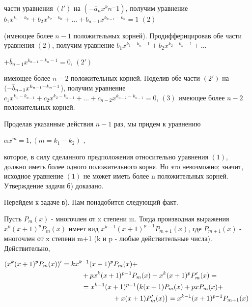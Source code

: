 \begin{minipage}[t]{0.71\textwidth}
части уравнения $(l')$ на $(-\overline{a}_nx^kn^-1)$, получим уравнение $b_1x^{k_1-k_n} + b_2x^{k_2-k_n} + \dots + b_{n-1}x^{k_{n-1}-k_n} = 1$\hspace{10.63cm} $(2)$

\vspace{0.2cm}
(имеющее более $n-1$ положительных корней). Продиффернцировав обе части уравнения $(2)$, получим уравнение $\overline{b}_1x^{k_1-k_n-1} + {\overline{b}_2x^{k_2-k_n-1} + \dots}$ 

\hspace{8.45cm}
$+\overline{b}_{n-1}x^{k_{n-1}-k_n-1} = 0$,
\hspace{1.2cm} $(2')$

\vspace{0.2cm}
имеющее более $n-2$ положительных корней. Поделив обе части $(2')$ на $(-\overline{b}_{n-1} \\ x^{k_{n-1}-k_n-1}$), получим уравнение $c_1x^{k_1-k_{n-1}} + c_2x^{k_2-k_{n-1}} + \dots + c_{n-2}x^{k_{n-2}-k_{n-1}} = 0$, $(3)$ имеющее более $n-2$ положительных корней.

\hspace{1cm}
Проделав указанные действия $n-1$ раз, мы придем к уравнению

\begin{center}
$\alpha x^m = 1, (m=k_1-k_2)$ ,
\end{center}
которое, в силу сделанного предположения относительно уравнения $(1)$, должно иметь более одного положительного корня. Но это невозможно; значит, исходное уравнение $(1)$ не может иметь более n положительных корней. Утверждение задачи б) доказано.

\hspace{1cm}
Перейдем к задаче в). Нам понадобится следующий факт.

Пусть $P_m(x)$ - многочлен от x степени m. Тогда производная выражения $x^k(x+1)^p P_m(x)$ имеет вид $x^{k-1}(x+1)^{p-1} P_{m+1}(x)$, где $P_{m+1}(x)$ - многочлен от x степени m+1 (k и p - любые действительные числа). \\
Действительно,
\vspace{0.1cm}

$\begin{aligned}
    (x^k(x+1)^p P_m(x))' &= kx^{k-1}(x+1)^pP_m(x) + \\
    &\hspace{1cm} + px^k(x+1)^{p-1}P_m(x) + x^k(x+1)^pP'_m(x) = \\
    &\hspace{1cm} = x^{k-1}(x+1)^{p-1} \big( k(x+1)P_m(x) + pxP_m(x) + \\
    &\hspace{2.6cm} + x(x+1)P'_m(x) \big) = x^{k-1}(x+1)^{p-1}P_{m+1}(x)
\end{aligned}$
\end{minipage}
